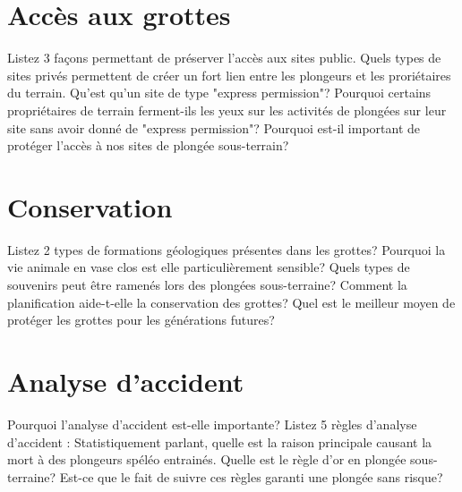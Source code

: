 \documentclass[english,10pt,a4paper]{article}
\begin{document}
	\section{Accès aux grottes}

	\begin{outline}
		\1 Listez 3 façons permettant de préserver l’accès aux sites public.
		\1 Quels types de sites privés permettent de créer un fort lien entre les plongeurs et les proriétaires du terrain.
		\1 Qu’est qu’un site de type "express permission"?
		\1 Pourquoi certains propriétaires de terrain ferment-ils les yeux sur les activités de plongées sur leur site sans avoir donné de "express permission"?
		\1 Pourquoi est-il important de protéger l’accès à nos sites de plongée sous-terrain?
	\end{outline}
	\sectionpage

	\section{Conservation}

	\begin{outline}
		\1 Listez 2 types de formations géologiques présentes dans les grottes?
		\1 Pourquoi la vie animale en vase clos est elle particulièrement sensible?
		\1 Quels types de souvenirs peut être ramenés lors des plongées sous-terraine?
		\1 Comment la planification aide-t-elle la conservation des grottes?
		\1 Quel est le meilleur moyen de protéger les grottes pour les générations futures?
	\end{outline}
	\sectionpage

	\section{Analyse d'accident}

	\begin{outline}
		\1 Pourquoi l’analyse d’accident est-elle importante?
		\1 Listez 5 règles d’analyse d’accident :
		\1 Statistiquement parlant, quelle est la raison principale causant la mort à des plongeurs spéléo entrainés.
		\1 Quelle est le règle d’or en plongée sous-terraine?
		\1 Est-ce que le fait de suivre ces règles garanti une plongée sans risque?
	\end{outline}
	\sectionpage
\end{document}
